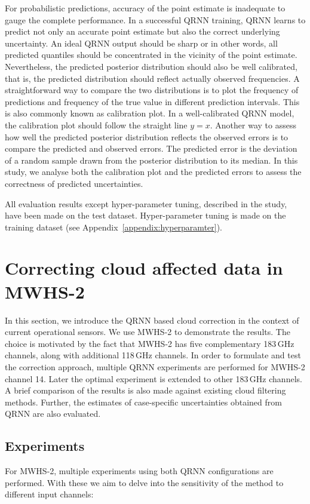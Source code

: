 \documentclass[amt, manuscript]{copernicus}
\begin{document}
For probabilistic predictions, accuracy of the point estimate is inadequate to
gauge the complete performance. In a successful QRNN training, QRNN learns to
predict not only an accurate point estimate but also the correct underlying
uncertainty. An ideal QRNN output should be sharp or in other words, all
predicted quantiles should be concentrated in the vicinity of the point
estimate. Nevertheless, the predicted posterior distribution should also be
well calibrated, that is, the predicted distribution should reflect actually
observed frequencies. A straightforward way to compare the two distributions is
to plot the frequency of predictions and frequency of the true value in
different prediction intervals. This is also commonly known as calibration plot.
In a well-calibrated QRNN model, the calibration plot should follow the straight
line $y = x$. Another way to assess how well the predicted posterior distribution
reflects the observed errors is to compare the predicted and observed errors.
The predicted error is the deviation of a random sample drawn from the posterior
distribution to its median. In this study, we analyse both the calibration plot
and the predicted errors to assess the correctness of predicted uncertainties.  

All evaluation results except hyper-parameter tuning, described in the study, have been made on the test dataset. Hyper-parameter tuning is made on the training dataset (see Appendix~\ref{appendix:hyperparamter}).


\section{Correcting cloud affected data in MWHS-2}
\label{qrnn_mwhs}
%
In this section, we introduce the QRNN based cloud correction in the context of current operational sensors.  We use MWHS-2 to demonstrate the results. The choice is motivated by the fact that MWHS-2 has five complementary 183\,GHz channels, along with additional 118\,GHz channels. In order to formulate and test the correction approach, multiple QRNN experiments are performed for MWHS-2 channel 14. Later the optimal experiment is extended to other 183\,GHz channels. A brief comparison of the results is also made against existing cloud filtering methods. Further, the estimates of case-specific uncertainties obtained from QRNN are also evaluated.

\subsection{Experiments}
%
\label{sec:QRNN_expt_MWHS}
For MWHS-2, multiple experiments using both QRNN configurations are performed. With these we aim to delve into the sensitivity of the method to different input channels:
\end{document}
